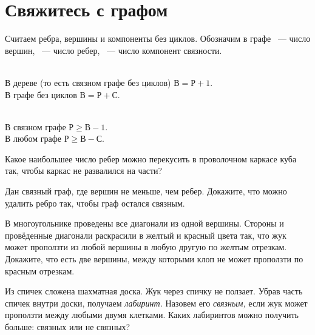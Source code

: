 
\section*{Свяжитесь с графом}




Считаем ребра, вершины и компоненты без циклов.
Обозначим в графе
~— число вершин,
~— число ребер,
~— число компонент связности.

\setcounter{jeolmsubproblem}{0}
\\
\subproblem
В дереве (то есть связном графе без циклов) $\text{В} = \text{Р} + 1$.
\\
\subproblem
В графе без циклов $\text{В} = \text{Р} + \text{С}$.

\setcounter{jeolmsubproblem}{0}
\\
\subproblem
В связном графе $\text{Р} \geq \text{В} - 1$.
\\
\subproblem
В любом графе $\text{Р} \geq \text{В} - \text{С}$.

\begin{problems}

\item
Какое наибольшее число ребер можно перекусить в проволочном каркасе куба так,
чтобы каркас не развалился на части?

\item
Дан связный граф, где вершин не меньше, чем ребер.
Докажите, что можно удалить ребро так, чтобы граф остался связным.

\item
В многоугольнике проведены все диагонали из одной вершины.
Стороны и провёденные диагонали раскрасили в желтый и красный цвета так, что
жук может проползти из любой вершины в любую другую по желтым отрезкам.
Докажите, что есть две вершины, между которыми клоп не может проползти
по красным отрезкам.

\item
Из спичек сложена шахматная доска.
Жук через спичку не ползает.
Убрав часть спичек внутри доски, получаем \emph{лабиринт.}
Назовем его \emph{связным,} если жук может проползти между любыми двумя клетками.
Каких лабиринтов можно получить больше: связных или не связных?

\end{problems}

